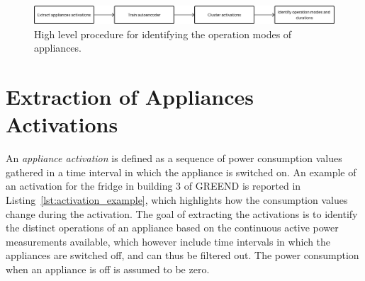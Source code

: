 \begin{figure}
  \centering
  \includegraphics[width=\linewidth]{images/modes_clustering/high_level_procedure.png}
  \caption[High level procedure for identifying the operation modes of appliances.]{High level procedure for identifying the operation modes of appliances.}
  \label{fig:high_level_procedure}
\end{figure}

\section{Extraction of Appliances Activations}

An \textit{appliance activation} is defined as a sequence of power consumption values gathered in a time interval in which the appliance is switched on. An example of an activation for the fridge in building 3 of GREEND is reported in Listing~\ref{lst:activation_example}, which highlights how the consumption values change during the activation. The goal of extracting the activations is to identify the distinct operations of an appliance based on the continuous active power measurements available, which however include time intervals in which the appliances are switched off, and can thus be filtered out. The power consumption when an appliance is off is assumed to be zero.

